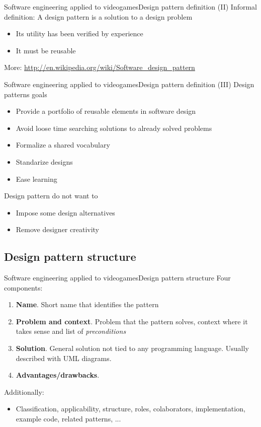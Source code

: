 \documentclass[10pt,compress]{beamer} %
\begin{document}
\begin{frame}{Software engineering applied to videogames}{Design pattern definition (II)}
		Informal definition: A design pattern is a solution to a design problem
			\begin{itemize}
			\item Its utility has been verified by experience
			\item It must be reusable
			\end{itemize}	
	\centering\scriptsize{More: \url{http://en.wikipedia.org/wiki/Software\_design\_pattern}}
\end{frame}

\begin{frame}{Software engineering applied to videogames}{Design pattern definition (III)}
	Design patterns goals
	\begin{itemize}
		\item Provide a portfolio of reusable elements in software design
		\item Avoid loose time searching solutions to already solved problems
		\item Formalize a shared vocabulary
		\item Standarize designs
		\item Ease learning
 	\end{itemize}
	Design pattern do not want to
	\begin{itemize}
		\item Impose some design alternatives
		\item Remove designer creativity
	\end{itemize}
\end{frame}

\subsection[Design pattern structure]{Design pattern structure}
\begin{frame}{Software engineering applied to videogames}{Design pattern structure}
	Four components:
	\begin{enumerate}
		\item \textbf{Name}. Short name that identifies the pattern
		\item \textbf{Problem and context}. Problem that the pattern solves, context where it takes sense and list of \textit{preconditions}
		\item \textbf{Solution}. General solution not tied to any programming language. Usually described with UML diagrams.
		\item \textbf{Advantages/drawbacks}.
	\end{enumerate}
	Additionally:
	\begin{itemize}
		\item Classification, applicability, structure, roles, colaborators, implementation, example code, related patterns, ...
	\end{itemize}
\end{frame}
\end{document}
